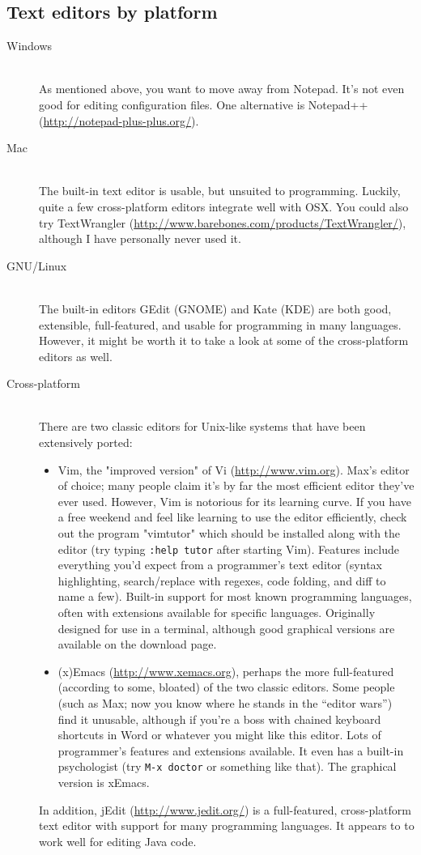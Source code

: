 \documentclass[12pt]{article}
\begin{document}
\subsection{Text editors by platform}
\begin{description}
    \item[Windows] \hfill \\
        As mentioned above, you want to move away from Notepad. It's not even good for editing configuration files. One alternative is Notepad++ (\url{http://notepad-plus-plus.org/}). 
    \item[Mac] \hfill \\
        The built-in text editor is usable, but unsuited to programming. Luckily, quite a few cross-platform editors integrate well with OSX. You could also try TextWrangler (\url{http://www.barebones.com/products/TextWrangler/}), although I have personally never used it.
    \item[GNU/Linux] \hfill \\
        The built-in editors GEdit (GNOME) and Kate (KDE) are both good, extensible, full-featured, and usable for programming in many languages. However, it might be worth it to take a look at some of the cross-platform editors as well.
    \item[Cross-platform] \hfill \\
        There are two classic editors for Unix-like systems that have been extensively ported: 
        \begin{itemize}
            \item Vim, the "improved version" of Vi (\url{http://www.vim.org}). Max's editor of choice; many people claim it's by far the most efficient editor they've ever used. However, Vim is notorious for its learning curve. If you have a free weekend and feel like learning to use the editor efficiently, check out the program "vimtutor" which should be installed along with the editor (try typing \texttt{:help tutor} after starting Vim). Features include everything you'd expect from a programmer's text editor (syntax highlighting, search/replace with regexes, code folding, and diff to name a few). Built-in support for most known programming languages, often with extensions available for specific languages. Originally designed for use in a terminal, although good graphical versions are available on the download page.
            \item (x)Emacs (\url{http://www.xemacs.org}), perhaps the more full-featured (according to some, bloated) of the two classic editors. Some people (such as Max; now you know where he stands in the ``editor wars'') find it unusable, although if you're a boss with chained keyboard shortcuts in Word or whatever you might like this editor. Lots of programmer's features and extensions available. It even has a built-in psychologist (try \texttt{M-x doctor} or something like that). The graphical version is xEmacs.
        \end{itemize}
        In addition, jEdit (\url{http://www.jedit.org/}) is a full-featured, cross-platform text editor with support for many programming languages. It appears to to work well for editing Java code.
\end{description}
\end{document}

